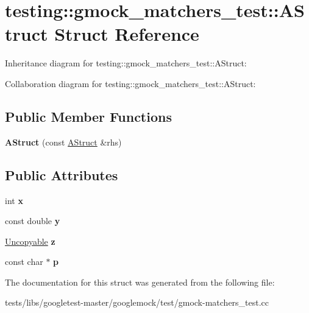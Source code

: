 \hypertarget{structtesting_1_1gmock__matchers__test_1_1AStruct}{}\section{testing\+:\+:gmock\+\_\+matchers\+\_\+test\+:\+:A\+Struct Struct Reference}
\label{structtesting_1_1gmock__matchers__test_1_1AStruct}


Inheritance diagram for testing\+:\+:gmock\+\_\+matchers\+\_\+test\+:\+:A\+Struct\+:


Collaboration diagram for testing\+:\+:gmock\+\_\+matchers\+\_\+test\+:\+:A\+Struct\+:
\subsection*{Public Member Functions}
\begin{DoxyCompactItemize}
\item 
\mbox{\label{structtesting_1_1gmock__matchers__test_1_1AStruct_ac5b9c0054e929e8883e13123aef50ff3}} 
{\bfseries A\+Struct} (const \hyperlink{structtesting_1_1gmock__matchers__test_1_1AStruct}{A\+Struct} \&rhs)
\end{DoxyCompactItemize}
\subsection*{Public Attributes}
\begin{DoxyCompactItemize}
\item 
\mbox{\label{structtesting_1_1gmock__matchers__test_1_1AStruct_a539eea02599ad34ff2bf90cc2c1adf26}} 
int {\bfseries x}
\item 
\mbox{\label{structtesting_1_1gmock__matchers__test_1_1AStruct_a08b8592764aa4775c3d5a3542470f8bb}} 
const double {\bfseries y}
\item 
\mbox{\label{structtesting_1_1gmock__matchers__test_1_1AStruct_a45b1006e4a7b21037610a385dcae6d8c}} 
\hyperlink{classtesting_1_1gmock__matchers__test_1_1Uncopyable}{Uncopyable} {\bfseries z}
\item 
\mbox{\label{structtesting_1_1gmock__matchers__test_1_1AStruct_a65755db7d763d53c13483bb520f1efcd}} 
const char $\ast$ {\bfseries p}
\end{DoxyCompactItemize}


The documentation for this struct was generated from the following file\+:\begin{DoxyCompactItemize}
\item 
tests/libs/googletest-\/master/googlemock/test/gmock-\/matchers\+\_\+test.\+cc\end{DoxyCompactItemize}

